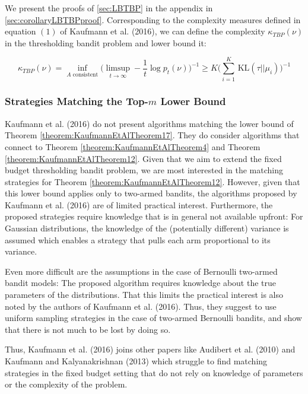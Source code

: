 \documentclass[11pt,]{article}
\newcommand{\KL}{\,\text{KL}}
\begin{document}
\label{corollary:LBKTBP}

We present the proofs of \autoref{sec:LBTBP} in the appendix in
\autoref{sec:corollaryLBTBPproof}. Corresponding to the complexity
measures defined in equation \((1)\) of Kaufmann et al. (2016), we can
define the complexity \(\kappa_{TBP}(\nu)\) in the thresholding bandit
problem and lower bound it:

\[
\kappa_{TBP}(\nu) = \inf_{A \text{ consistent}} \Big(\limsup_{t \rightarrow \infty} - \frac{1}{t} \log p_t(\nu)\Big)^{-1} \geq K \Big(\sum_{i=1}^{K} \KL(\tau||\mu_i)\Big)^{-1}
\]

\subsubsection{\texorpdfstring{Strategies Matching the Top-\(m\) Lower
Bound}{Strategies Matching the Top-m Lower Bound}}\label{strategies-matching-the-top-m-lower-bound}

Kaufmann et al. (2016) do not present algorithms matching the lower
bound of Theorem \ref{theorem:KaufmannEtAlTheorem17}. They do consider
algorithms that connect to Theorem \ref{theorem:KaufmannEtAlTheorem4}
and Theorem \ref{theorem:KaufmannEtAlTheorem12}. Given that we aim to
extend the fixed budget thresholding bandit problem, we are most
interested in the matching strategies for Theorem
\ref{theorem:KaufmannEtAlTheorem12}. However, given that this lower
bound applies only to two-armed bandits, the algorithms proposed by
Kaufmann et al. (2016) are of limited practical interest. Furthermore,
the proposed strategies require knowledge that is in general not
available upfront: For Gaussian distributions, the knowledge of the
(potentially different) variance is assumed which enables a strategy
that pulls each arm proportional to its variance.

Even more difficult are the assumptions in the case of Bernoulli
two-armed bandit models: The proposed algorithm requires knowledge about
the true parameters of the distributions. That this limits the practical
interest is also noted by the authors of Kaufmann et al. (2016). Thus,
they suggest to use uniform sampling strategies in the case of two-armed
Bernoulli bandits, and show that there is not much to be lost by doing
so.

Thus, Kaufmann et al. (2016) joins other papers like Audibert et al.
(2010) and Kaufmann and Kalyanakrishnan (2013) which struggle to find
matching strategies in the fixed budget setting that do not rely on
knowledge of parameters or the complexity of the problem.
\end{document}
